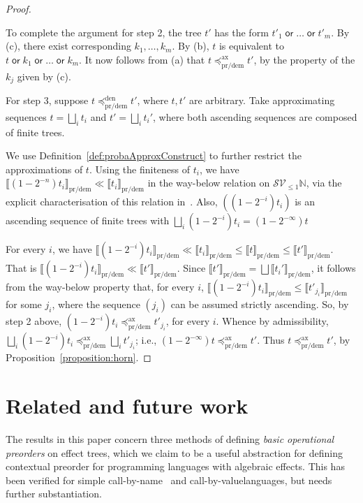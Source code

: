 \documentclass[a4paper,UKenglish]{lipics-v2018}
\newcommand{\Basicleq}{\preccurlyeq}
\newcommand{\orEff}{\operatorname{\textsf{or}}}
\newcommand{\prdem}{\text{pr/dem}}
\newcommand{\Den}{\text{den}}
\newcommand{\Ax}{\text{ax}}
\newcommand{\Sem}[1]{\llbracket #1 \rrbracket}
\newcommand{\Iter}[2]{(1\!-\!2^{- #2})#1}
\theoremstyle{plain}
\begin{document}
\begin{proof}
\begin{enumerate}[(a)]
  
      \end{enumerate}
To complete the argument for step 2, the  tree $t'$ has the form $t'_1 \orEff \dots \orEff t'_m$. By (c), there exist corresponding  $k_1, \dots, k_m$. By (b), $t$ is equivalent to
$t \orEff k_1 \orEff \dots \orEff k_m$. It now follows from (a) that $t \Basicleq^\Ax_\prdem t'$,
by the property of the $k_j$ given by (c).


For step 3, suppose 
$t \Basicleq^\Den_\prdem t'$, where $t,t'$ are arbitrary.
Take approximating sequences  $t = \bigsqcup_i t_i$ and $t' = \bigsqcup_i t_i'$,
    where both ascending sequences are composed of {finite} trees.

We use Definition~\ref{def:probaApproxConstruct} to further restrict the approximations of $t$.
Using the finiteness of $t_i$,
we have $\Sem{\Iter{t_i}{n}}_\prdem \ll \Sem{t_i}_\prdem$ in the way-below relation 
on $\mathcal{S}\mathcal{V}_{\leq 1} \mathbb{N}$, via the explicit characterisation of this relation in~\cite{KeimelP2016}. Also, $(\Iter{t_i}{i})$ is an ascending sequence 
of finite trees with $\bigsqcup_i \Iter{t_i}{i} = \Iter{t}{\infty}$

For every $i$, we have 
$\Sem{\Iter{t_i}{i}}_\prdem \ll  \Sem{t_i}_\prdem \leq \Sem{t}_\prdem \leq \Sem{t'}_\prdem$. That is $\Sem{\Iter{t_i}{i}}_\prdem \ll  \Sem{t'}_\prdem$. 
Since $\Sem{t'}_\prdem = \bigsqcup \Sem{t_i'}_\prdem$, it follows from the way-below property that, for every $i$, 
$\Sem{\Iter{t_i}{i}}_\prdem \leq \Sem{t'_{j_i}}_\prdem$ for some $j_i$, where the sequence
 $(j_i)$ can be assumed strictly ascending.
So, by step 2 above, 
$\Iter{t_i}{i} \Basicleq^\Ax_\prdem t'_{j_i}$, for every $i$.
Whence by admissibility, 
$\bigsqcup_i \Iter{t_i}{i} \Basicleq^\Ax_\prdem  \bigsqcup_i t'_{j_i}$; i.e.,
$\Iter{t}{\infty}  \Basicleq^\Ax_\prdem  t'$. 
Thus $t \Basicleq^\Ax_\prdem  t'$, by Proposition~\ref{proposition:horn}.
 \end{proof}



\section{Related and future work}
\label{section:conclusions}

The results in this paper concern three methods of defining \emph{basic operational preorders} on effect trees, which we claim to be a useful abstraction for defining contextual preorder for programming languages with algebraic effects. This has been verified for simple call-by-name~\cite{gom} and call-by-value\footnotemark[3] languages, but needs further substantiation.
\end{document}
